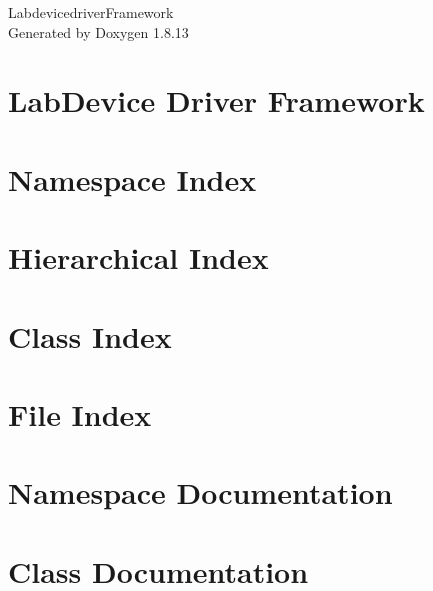 \documentclass[twoside]{book}
\newcommand{\+}{\discretionary{\mbox{\scriptsize$\hookleftarrow$}}{}{}}
\newcommand{\clearemptydoublepage}{%
  \newpage{\pagestyle{empty}\cleardoublepage}%
}
\begin{document}
\hypersetup{pageanchor=false,
             bookmarksnumbered=true,
             pdfencoding=unicode
            }
\begin{titlepage}
\vspace*{7cm}
\begin{center}%
{\Large Labdevicedriver\+Framework }\\
\vspace*{1cm}
{\large Generated by Doxygen 1.8.13}\\
\end{center}
\end{titlepage}
\clearemptydoublepage
{}
\tableofcontents
\clearemptydoublepage
{}
\hypersetup{pageanchor=true}

\chapter{Lab\+Device Driver Framework}
\label{index}\hypertarget{index}{}
\chapter{Namespace Index}

\chapter{Hierarchical Index}

\chapter{Class Index}

\chapter{File Index}

\chapter{Namespace Documentation}




\chapter{Class Documentation}











\end{document}

